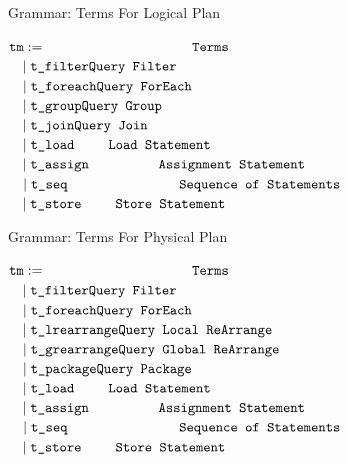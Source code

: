 \begin{frame}{Grammar: Terms For Logical Plan}
\centering
	\begin{flushleft}
	$ \texttt{tm} := \qquad\qquad\qquad\qquad\qquad\:\: \texttt{Terms}\hfill$\\
	$ \quad \mid \texttt{t\_filter}\hfill \texttt{Query Filter}\hfill$\\
   	$ \quad \mid \texttt{t\_foreach} \hfill \texttt{Query ForEach}\hfill$\\
    $ \quad \mid \texttt{t\_group} \hfill \texttt{Query Group}\hfill$\\
    $ \quad \mid \texttt{t\_join} \hfill \texttt{Query Join}\hfill$\\
    $ \quad \mid \texttt{t\_load} \hfill \quad\quad\:\: \texttt{Load Statement}\hfill$\\
   	$ \quad \mid \texttt{t\_assign} \hfill \qquad\qquad\quad \texttt{Assignment Statement}\hfill$\\
    $ \quad \mid \texttt{t\_seq} \hfill \qquad\qquad\qquad\quad\quad \texttt{Sequence of Statements}\hfill$\\
    $ \quad \mid \texttt{t\_store} \hfill \quad\quad\:\: \texttt{Store Statement}\hfill$\\
	\end{flushleft}
\end{frame}
\begin{frame}{Grammar: Terms For Physical Plan}
\centering
	\begin{flushleft}
	$ \texttt{tm} := \qquad\qquad\qquad\qquad\qquad\:\: \texttt{Terms}\hfill$\\
	$ \quad \mid \texttt{t\_filter}\hfill \texttt{Query Filter}\hfill$\\
   	$ \quad \mid \texttt{t\_foreach} \hfill \texttt{Query ForEach}\hfill$\\
    $ \quad \mid \texttt{t\_lrearrange} \hfill \texttt{Query Local ReArrange}\hfill$\\
    $ \quad \mid \texttt{t\_grearrange} \hfill \texttt{Query Global ReArrange}\hfill$\\
    $ \quad \mid \texttt{t\_package} \hfill \texttt{Query Package}\hfill$\\
    $ \quad \mid \texttt{t\_load} \hfill \quad\quad\:\: \texttt{Load Statement}\hfill$\\
   	$ \quad \mid \texttt{t\_assign} \hfill \qquad\qquad\quad \texttt{Assignment Statement}\hfill$\\
    $ \quad \mid \texttt{t\_seq} \hfill \qquad\qquad\qquad\quad\quad \texttt{Sequence of Statements}\hfill$\\
    $ \quad \mid \texttt{t\_store} \hfill \quad\quad\:\: \texttt{Store Statement}\hfill$\\
	\end{flushleft}
\end{frame}

